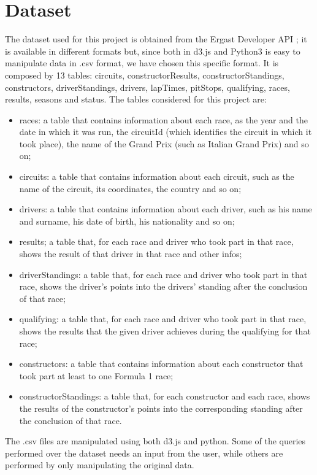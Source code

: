 \documentclass[11pt,twocolumn,letterpaper]{article}
\begin{document}
\section{Dataset}
The dataset used for this project is obtained from the Ergast Developer API \cite{Dataset}; it is available in different formats but, since both in d3.js \cite{D3} and Python3 is easy to manipulate data in .csv format, we have chosen this specific format. It is composed by 13 tables: circuits, constructorResults, constructorStandings, constructors, driverStandings, drivers, lapTimes, pitStops, qualifying, races, results, seasons and status. The tables considered for this project are:
\begin{itemize}
	\item races: a table that contains information about each race, as the year and the date in which it was run, the circuitId (which identifies the circuit in which it took place), the name of the Grand Prix (such as Italian Grand Prix) and so on;
	\item circuits: a table that contains information about each circuit, such as the name of the circuit, its coordinates, the country and so on;
	\item drivers: a table that contains information about each driver, such as his name and surname, his date of birth, his nationality and so on;
	\item results; a table that, for each race and driver who took part in that race, shows the result of that driver in that race and other infos;
	\item driverStandings: a table that, for each race and driver who took part in that race, shows the driver's points into the drivers' standing after the conclusion of that race;
	\item qualifying: a table that, for each race and driver who took part in that race, shows the results that the given driver achieves during the qualifying for that race;
	\item constructors: a table that contains information about each constructor that took part at least to one Formula 1 race;
	\item constructorStandings: a table that, for each constructor and each race, shows the results of the constructor's points into the corresponding standing after the conclusion of that race. 
\end{itemize}
The .csv files are manipulated using both d3.js and python. Some of the queries performed over the dataset needs an input from the user, while others are performed by only manipulating the original data.
\end{document}
